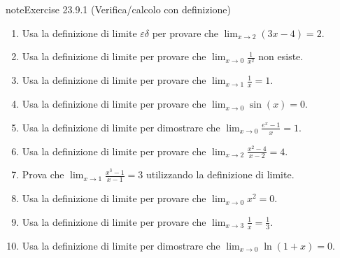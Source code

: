 \documentclass[letterpaper,10pt,italian]{jupyterBook}
\begin{document}
\begin{sphinxadmonition}{note}{Exercise 23.9.1 (Verifica/calcolo con definizione)}


\begin{enumerate}
%
\item {} 
\sphinxAtStartPar
Usa la definizione di limite \(\varepsilon\)\sphinxhyphen{}\(\delta\) per provare che \(\lim_{x \to 2} (3x - 4) = 2\).

\item {} 
\sphinxAtStartPar
Usa la definizione di limite per provare che \(\lim_{x \to 0} \frac{1}{x^2}\) non esiste.

\item {} 
\sphinxAtStartPar
Usa la definizione di limite per provare che \(\lim_{x \to 1} \frac{1}{x} = 1\).

\item {} 
\sphinxAtStartPar
Usa la definizione di limite per provare che \(\lim_{x \to 0} \sin(x) = 0\).

\item {} 
\sphinxAtStartPar
Usa la definizione di limite per dimostrare che \(\lim_{x \to 0} \frac{e^x - 1}{x} = 1\).

\item {} 
\sphinxAtStartPar
Usa la definizione di limite per provare che \(\lim_{x \to 2} \frac{x^2 - 4}{x - 2} = 4\).

\item {} 
\sphinxAtStartPar
Prova che \(\lim_{x \to 1} \frac{x^3 - 1}{x - 1} = 3\) utilizzando la definizione di limite.

\item {} 
\sphinxAtStartPar
Usa la definizione di limite per provare che \(\lim_{x \to 0} x^2 = 0\).

\item {} 
\sphinxAtStartPar
Usa la definizione di limite per provare che \(\lim_{x \to 3} \frac{1}{x} = \frac{1}{3}\).

\item {} 
\sphinxAtStartPar
Usa la definizione di limite per dimostrare che \(\lim_{x \to 0} \ln(1+x) = 0\).

\end{enumerate}
\end{sphinxadmonition}
 \label{exercise:ch/infinitesimal_calculus/analysis-problems-exercise-1}
\end{document}
